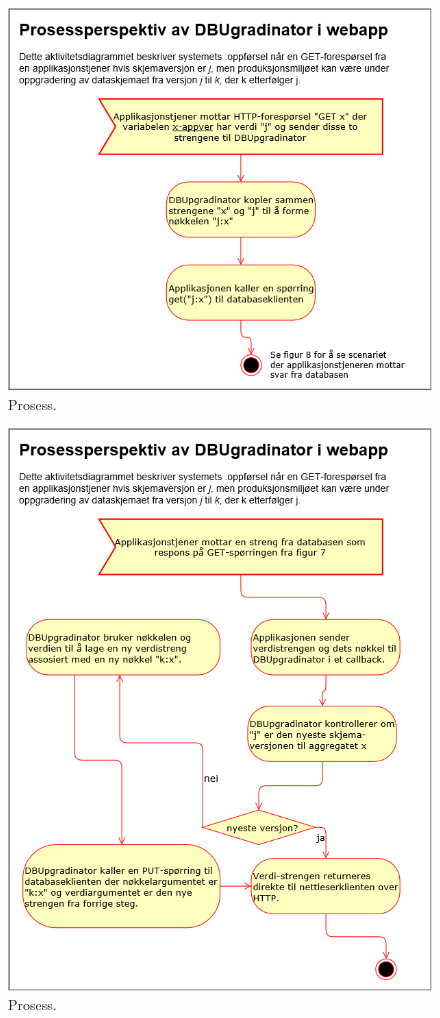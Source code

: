 \begin{figure}[!ht]
    \centering
    \includegraphics[scale=0.6]{fig/dbupgradinator-prosess-1.png}
    \caption{Prosess.}
    \label{fig7}
\end{figure}

\newpage

\begin{figure}[!ht]
    \centering
    \includegraphics[scale=0.6]{fig/dbupgradinator-prosess-2.png}
    \caption{Prosess.}
    \label{fig8}
\end{figure}

